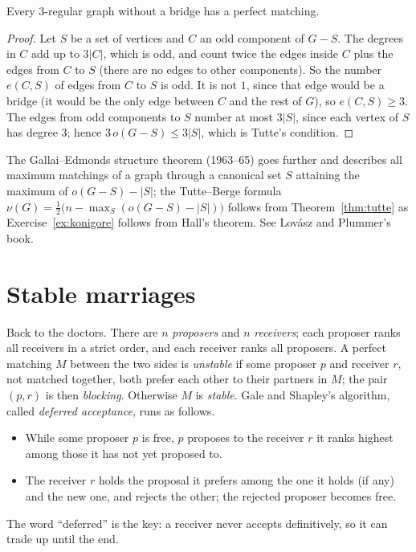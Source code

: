 \begin{corollary}[Petersen, 1891]\label{cor:petersen}
Every $3$-regular graph without a bridge has a perfect matching.
\end{corollary}
\begin{proof}
Let $S$ be a set of vertices and $C$ an odd component of $G-S$. The degrees in $C$ add up to $3|C|$, which is odd, and count twice the
edges inside $C$ plus the edges from $C$ to $S$ (there are no edges to other components). So the number $e(C,S)$ of edges from $C$ to $S$ is odd.
It is not $1$, since that edge would be a bridge (it would be the only edge between $C$ and the rest of $G$), so $e(C,S)\ge3$. The edges from
odd components to $S$ number at most $3|S|$, since each vertex of $S$ has degree $3$; hence $3\,o(G-S)\le3|S|$, which is Tutte's condition.
\end{proof}

\begin{remark}
The Gallai--Edmonds structure theorem (1963--65) goes further and describes all maximum matchings of a graph through a
canonical set $S$ attaining the maximum of $o(G-S)-|S|$; the Tutte--Berge formula $\nu(G)=\frac12\bigl(n-\max_S(o(G-S)-|S|)\bigr)$
follows from Theorem~\ref{thm:tutte} as Exercise~\ref{ex:konigore} follows from Hall's theorem. See Lov\'asz and Plummer's book.
\end{remark}

\section{Stable marriages}

Back to the doctors. There are $n$ \emph{proposers} and $n$ \emph{receivers}; each proposer ranks all receivers in a strict order, and
each receiver ranks all proposers. A perfect matching $M$ between the two sides is \emph{unstable} if some proposer $p$ and receiver $r$,
not matched together, both prefer each other to their partners in $M$; the pair $(p,r)$ is then \emph{blocking}. Otherwise $M$ is
\emph{stable}. Gale and Shapley's algorithm, called \emph{deferred acceptance}, runs as follows.
\begin{itemize}
\item While some proposer $p$ is free, $p$ proposes to the receiver $r$ it ranks highest among those it has not yet proposed to.
\item The receiver $r$ holds the proposal it prefers among the one it holds (if any) and the new one, and rejects the other; the
rejected proposer becomes free.
\end{itemize}
The word ``deferred'' is the key: a receiver never accepts definitively, so it can trade up until the end.

